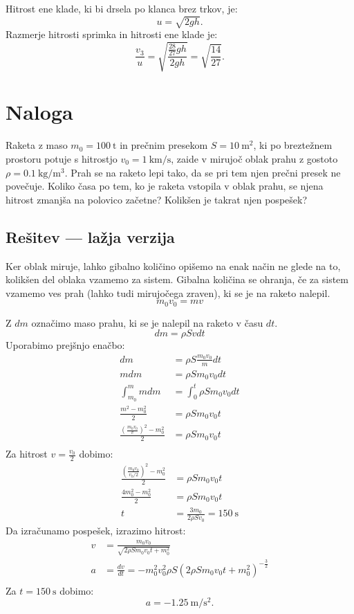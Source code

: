 \documentclass[a4,11pt]{article}
\begin{document}
    Hitrost ene klade, ki bi drsela po klanca brez trkov, je:
    \[u = \sqrt{2gh}.\]
    Razmerje hitrosti sprimka in hitrosti ene klade je:
    \[\frac{v_3}{u} = \sqrt{\frac{\frac{28}{27}gh}{2gh}} = \sqrt{\frac{14}{27}}.\]

\section{Naloga}
    Raketa z maso \(m_0 = \qty{100}{\tonne}\) in prečnim presekom \(S = \qty{10}{\metre\squared}\), ki po breztežnem prostoru potuje s
    hitrostjo \(v_0 = \qty{1}{\kilo\metre\per\second}\), zaide v mirujoč oblak prahu z gostoto \(\rho = \qty{0.1}{\kg\per\metre\cubed}\). Prah se na raketo lepi
    tako, da se pri tem njen prečni presek ne povečuje. Koliko časa po tem, ko je raketa vstopila v
    oblak prahu, se njena hitrost zmanjša na polovico začetne? Kolikšen je takrat njen pospešek?

\subsection*{Rešitev --- lažja verzija}
    Ker oblak miruje, lahko gibalno količino opišemo na enak način ne glede na to, kolikšen del oblaka vzamemo za sistem.
    Gibalna količina se ohranja, če za sistem vzamemo ves prah (lahko tudi mirujočega zraven), ki se je na raketo nalepil.
    \[m_0 v_0 = m v\]

    Z \(dm\) označimo maso prahu, ki se je nalepil na raketo v času \(dt\).
    \[dm = \rho S v dt\]
    Uporabimo prejšnjo enačbo:
    \begin{align*}
        dm &= \rho S \frac{m_0 v_0}{m} dt \\
        m dm &= \rho S m_0 v_0 dt \\
        \int_{m_0}^{m} m dm &= \int_{0}^{t} \rho S m_0 v_0 dt \\
        \frac{m^2 - m_0^2}{2} &= \rho S m_0 v_0 t \\
        \frac{{\left(\frac{m_0 v_0}{v}\right)}^2 - m_0^2}{2} &= \rho S m_0 v_0 t \\
    \end{align*}
    Za hitrost \(v = \frac{v_0}{2}\) dobimo:
    \begin{align*}
        \frac{{\left(\frac{m_0 v_0}{v_0/2}\right)}^2 - m_0^2}{2} &= \rho S m_0 v_0 t \\
        \frac{4m_0^2 - m_0^2}{2} &= \rho S m_0 v_0 t \\
        t &= \frac{3m_0}{2\rho S v_0} = \qty{150}{\s}
    \end{align*}
    Da izračunamo pospešek, izrazimo hitrost:
    \begin{align*}
        v &= \frac{m_0 v_0}{\sqrt{2\rho S m_0 v_0 t + m_0^2}} \\
        a &= \frac{dv}{dt} = - m_0^2 v_0^2 \rho S {\left(2\rho S m_0 v_0 t + m_0^2\right)}^{-\frac{3}{2}} \\
    \end{align*}
    Za \(t = \qty{150}{\s}\) dobimo:
    \[a = \qty{-1.25}{\metre\per\second\squared}.\]
\end{document}

